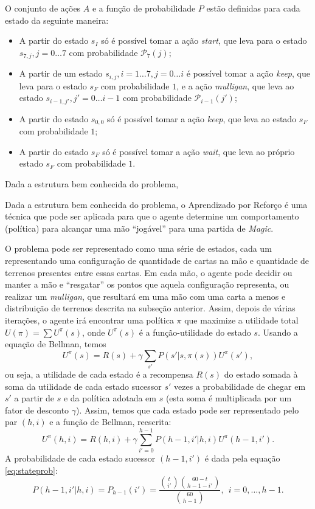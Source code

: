 \documentclass{book}
\begin{document}
O conjunto de ações $A$ e a função de probabilidade $P$ estão definidas para cada estado da seguinte maneira:
\begin{itemize}
  \item A partir do estado $s_I$ só é possível tomar a ação \textit{start}, que leva para o estado $s_{7, j}, j = 0 \ldots 7$ com probabilidade $\mathcal{P}_7(j)$;
  \item A partir de um estado $s_{i, j}, i=1 \ldots 7, j=0 \ldots i$ é possível tomar a ação \textit{keep}, que leva para o estado $s_F$ com probabilidade $1$,
  e a ação \textit{mulligan}, que leva ao estado $s_{i-1, j'}, j'=0 \ldots i-1$ com probabilidade $\mathcal{P}_{i-1}(j')$;
  \item A partir do estado $s_{0, 0}$ só é possível tomar a ação \textit{keep}, que leva ao estado $s_F$ com probabilidade $1$;
  \item A partir do estado $s_F$ só é possível tomar a ação \textit{wait}, que leva ao próprio estado $s_F$ com probabilidade $1$.
\end{itemize}


Dada a estrutura bem conhecida do problema,

Dada a estrutura bem conhecida do problema, o Aprendizado por Reforço é
uma técnica que pode ser aplicada
para que o agente determine um comportamento (política) para alcançar
uma mão ``jogável'' para uma partida de \textit{Magic}.

O problema pode ser representado como uma série de estados, cada um
representando uma configuração de quantidade de cartas na mão
e quantidade de terrenos presentes entre essas cartas. Em cada mão, o
agente pode decidir ou manter a mão e ``resgatar''
os pontos que aquela configuração representa, ou realizar um
\textit{mulligan}, que resultará em uma mão com uma carta a menos e
distribuição de terrenos descrita na subseção anterior. Assim, depois de
várias iterações, o agente irá encontrar uma política $\pi$
que maximize a utilidade total $U(\pi) = \sum U^\pi(s)$, onde $U^\pi(s)$
é a função-utilidade do estado $s$. Usando a equação de
Bellman, temos \[ U^\pi(s) = R(s) + \gamma\sum\limits_{s'}P(s' | s,
\pi(s))U^\pi(s'),\] ou seja, a utilidade de cada estado é a recompensa
$R(s)$
do estado somada à soma da utilidade de cada estado sucessor $s'$ vezes
a probabilidade de chegar em $s'$ a partir de $s$ e da política adotada
em $s$ (esta soma é multiplicada por um fator de desconto $\gamma$).
Assim, temos que cada estado pode ser representado pelo par $(h, i)$ e a
função de Bellman, reescrita:
\begin{equation} \label{eq:mullbellman}U^\pi(h, i) = R(h, i) + \gamma
\sum\limits_{i' = 0}^{h - 1}P(h-1, i' | h , i )U^\pi(h - 1,
i').\end{equation}
A probabilidade de cada estado sucessor $(h- 1, i')$ é dada pela equação
\ref{eq:stateprob}:
\[P(h-1, i' | h, i) = P_{h-1}(i') = \frac{\binom{t}{i'}\binom{60 - t}{h
- 1 -
i'}}{\binom{60}{h - 1}}, \ \  i = 0,\ldots, h - 1.\]
\end{document}
